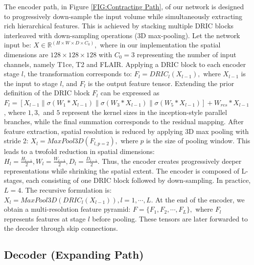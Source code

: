 \documentclass[a4paper,fleqn]{cas-dc}
\begin{document}
The encoder path, in Figure \ref{FIG:Contracting Path}, of our network is designed to progressively down-sample the input volume while simultaneously extracting rich hierarchical features. This is achieved by stacking multiple DRIC blocks interleaved with down-sampling operations (3D max-pooling).
Let the network input be: $X\in \mathbb{R}^{(H\times W\times D\times C_0)},$ where in our implementation the spatial dimensions are $128\times 128\times 128$ with $C_0 = 3$ representing the number of input channels, namely T1ce, T2 and FLAIR. Applying a DRIC block to each encoder stage $l$, the transformation corresponds to: $F_l=DRIC_l(X_{l-1}),$ where $X_{l-1}$ is the input to stage $l$, and $F_l$ is the output feature tensor. Extending the prior definition of the DRIC block $F_l$ can be expressed as $F_l=[X_{l-1} \| \sigma(W_1 *X_{l-1}) \| \sigma(W_3 *X_{l-1} ) \| \sigma(W_5 *X_{l-1} )]+W_{res} *X_{l-1}$, where $1, 3,$ and $5$ represent the kernel sizes in the inception-style parallel branches, while the final summation corresponds to the residual mapping.
After feature extraction, spatial resolution is reduced by applying 3D max pooling with stride 2:   $X_l=MaxPool3D(F_{l,p=2}),$ where $p$ is the size of pooling window. This leads to a twofold reduction in spatial dimensions: $H_l=\tfrac{H_{l-1}}{2}, W_l=\tfrac{W_{l-1}}{2}, D_l=\tfrac{D_{l-1}}{2}$. Thus, the encoder creates progressively deeper representations while shrinking the spatial extent.
The encoder is composed of L-stages, each consisting of one DRIC block followed by down-sampling. In practice, $L=4$. The recursive formulation is: $X_l=MaxPool3D(DRIC_l (X_{l-1})), l=1,\cdots,L$.
At the end of the encoder, we obtain a multi-resolution feature pyramid: $F=\{F_1,F_2,\cdots,F_L\},$ where $F_l$ represents features at stage $l$ before pooling. These tensors are later forwarded to the decoder through skip connections.


\subsection{Decoder (Expanding Path)}
\end{document}
